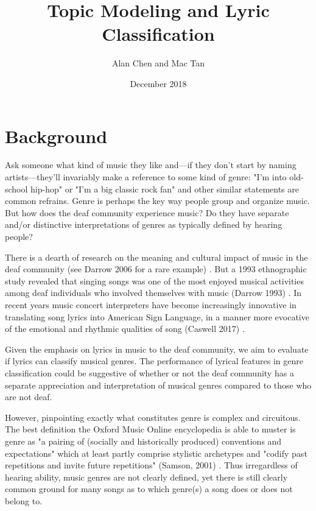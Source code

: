\documentclass[12pt, titlepage]{article}
\title{Topic Modeling and Lyric Classification}
\author{Alan Chen and Mac Tan}
\date{December 2018}
\begin{document}
\maketitle

\section{Background}
Ask someone what kind of music they like and---if they don't start by naming artists---they'll invariably make a reference to some kind of genre: "I'm into old-school hip-hop" or "I'm a big classic rock fan" and other similar statements are common refrains. Genre is perhaps the key way people group and organize music. But how does the deaf community experience music? Do they have separate and/or distinctive interpretations of genres as typically defined by hearing people?

There is a dearth of research on the meaning and cultural impact of music in the deaf community (see Darrow 2006 for a rare example) \cite{darrow_2006}. But a 1993 ethnographic study revealed that singing songs was one of the most enjoyed musical activities among deaf individuals who involved themselves with music (Darrow 1993) \cite{darrow_1993}. In recent years music concert interpreters have become increasingly innovative in translating song lyrics into American Sign Language, in a manner more evocative of the emotional and rhythmic qualities of song (Caswell 2017) \cite{vox_2017}.

Given the emphasis on lyrics in music to the deaf community, we aim to evaluate if lyrics can classify musical genres. The performance of lyrical features in genre classification could be suggestive of whether or not the deaf community has a separate appreciation and interpretation of musical genres compared to those who are not deaf.

However, pinpointing exactly what constitutes genre is complex and circuitous. The best definition the Oxford Music Online encyclopedia is able to muster is genre as "a pairing of (socially and historically produced) conventions and expectations" which at least partly comprise stylistic archetypes and "codify past repetitions and invite future repetitions" (Samson, 2001) \cite{samson_2001}. Thus irregardless of hearing ability, music genres are not clearly defined, yet there is still clearly common ground for many songs as to which genre(s) a song does or does not belong to.
\end{document}
